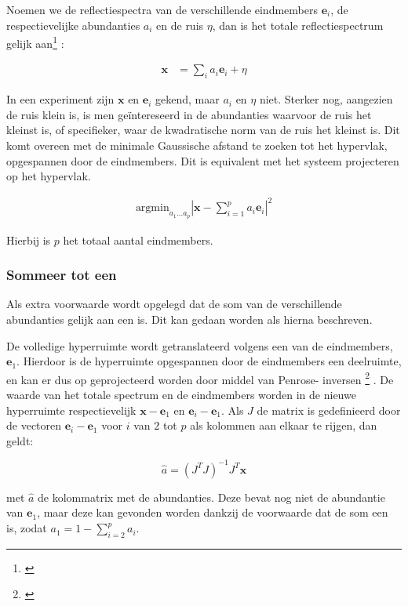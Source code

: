 \documentclass[12pt]{report}
\newcommand{\footcite}[1]{\cite{#1}\let\thefootnote\relax \footnote{\cite{#1} \bibentry{#1}} }
\begin{document}
Noemen we de reflectiespectra van de verschillende eindmembers $\bm{e}_i$, de respectievelijke abundanties $a_i$ en de ruis $\eta$, dan is het totale reflectiespectrum gelijk aan\footcite{mesma}:

\begin{align}
\bm{x} &= \sum_i a_i \bm{e}_i + \eta
\end{align}

In een experiment zijn $\bm{x}$ en $\bm{e}_i$ gekend, maar $a_i$ en $\eta$ niet. Sterker nog, aangezien de ruis klein is, is men ge\"intereseerd in de abundanties waarvoor de ruis het kleinst is, of specifieker, waar de kwadratische norm van de ruis het kleinst is. Dit komt overeen met de minimale Gaussische afstand te zoeken tot het hypervlak, opgespannen door de eindmembers. Dit is equivalent met het systeem projecteren op het hypervlak. %

\begin{align}
\text{argmin}_{a_1 ... a_p} \left| \bm{x} - \sum_{i=1}^p a_i \bm{e}_i\right|^2
\end{align}

Hierbij is $p$ het totaal aantal eindmembers.


\subsubsection{Sommeer tot een}

Als extra voorwaarde wordt opgelegd dat de som van de verschillende abundanties gelijk aan een is. Dit kan gedaan worden als hierna beschreven. 

De volledige hyperruimte wordt getranslateerd volgens een van de eindmembers, $\bm{e}_1$. Hierdoor is de hyperruimte opgespannen door de eindmembers een deelruimte, en kan er dus op geprojecteerd worden door middel van Penrose- inversen \footcite{mesma}. De waarde van het totale spectrum en de eindmembers worden in de nieuwe hyperruimte respectievelijk $\bm{x} - \bm{e}_1$ en $\bm{e}_i - \bm{e}_1$. Als $J$ de matrix is gedefinieerd door de vectoren $\bm{e}_i - \bm{e}_1$ voor $i$ van $2$ tot $p$ als kolommen aan elkaar te rijgen, dan geldt:

\begin{equation}
\hat{a} = \left(J^T J\right)^{-1} J^T \bm{x}
\end{equation} 

met $\hat{a}$ de kolommatrix met de abundanties. Deze bevat nog niet de abundantie van $\bm{e}_1$, maar deze kan gevonden worden dankzij de voorwaarde dat de som een is, zodat $a_1 = 1 - \sum_{i=2}^{p} a_i$.
\end{document}
